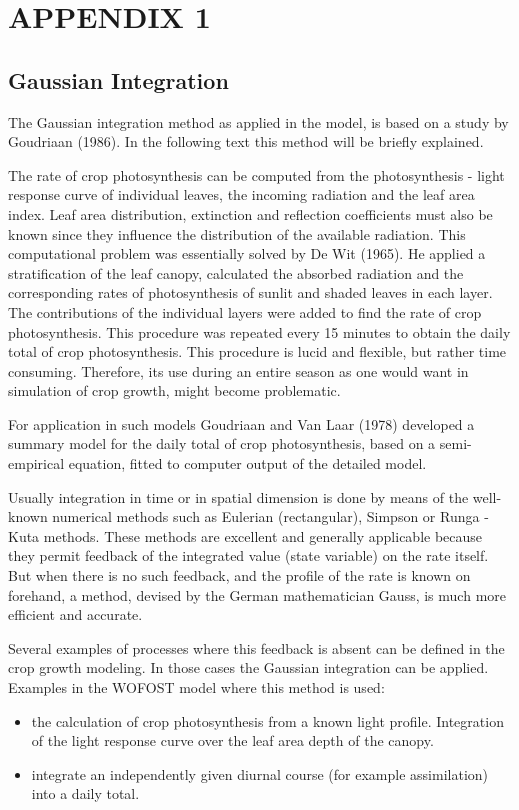 \chapter*{APPENDIX 1}

\section*{Gaussian Integration}

The Gaussian integration method as applied in the model, is based on a study by Goudriaan
(1986). In the following text this method will be briefly explained.

The rate of crop photosynthesis can be computed from the photosynthesis - light response
curve of individual leaves, the incoming radiation and the leaf area index. Leaf area
distribution, extinction and reflection coefficients must also be known since they influence
the distribution of the available radiation. This computational problem was essentially solved
by De Wit (1965). He applied a stratification of the leaf canopy, calculated the absorbed
radiation and the corresponding rates of photosynthesis of sunlit and shaded leaves in each
layer. The contributions of the individual layers  were added to find the rate of crop
photosynthesis. This procedure was repeated every 15 minutes to obtain the daily total of
crop photosynthesis. This procedure is lucid and flexible, but rather time consuming.
Therefore, its use during an entire season as one would want in simulation of crop growth,
might become problematic.

For application in such models Goudriaan and Van Laar (1978) developed a summary model
for the daily total of crop photosynthesis, based on a semi-empirical equation, fitted to
computer output of the detailed model.

Usually integration in time or in spatial dimension is done by means of the well-known
numerical methods such as Eulerian (rectangular), Simpson or Runga - Kuta methods. These
methods are excellent and generally applicable because they permit feedback of the
integrated value (state variable) on the rate itself. But when there is no such feedback, and
the profile of the rate is known on forehand, a method, devised by the German
mathematician Gauss, is much more efficient and accurate. 

Several examples of processes where this feedback is absent can be defined in the crop
growth modeling. In those cases the Gaussian integration can be applied. Examples in the
WOFOST model where this method is used:
\begin{itemize}
\item the calculation of crop photosynthesis from a known light profile. Integration
    of the light response curve over the leaf area depth of the canopy. 
\item integrate an independently given diurnal course (for example assimilation) into
    a daily total.
\end{itemize}

